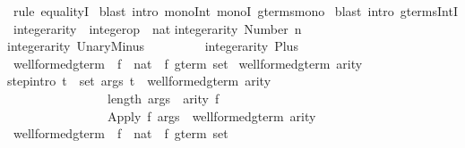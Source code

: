 \begin{isabellebody}
\ {\isacharparenleft}rule\ equalityI{\isacharparenright}\isanewline
{}\ {\isacharparenleft}blast\ intro{\isacharbang}{\isacharcolon}\ mono{\isacharunderscore}Int\ monoI\ gterms{\isacharunderscore}mono{\isacharparenright}\isanewline
{}\ {\isacharparenleft}blast\ intro{\isacharbang}{\isacharcolon}\ gterms{\isacharunderscore}IntI{\isacharparenright}\isanewline
{}\isanewline
\isanewline
\isanewline
{}\ integer{\isacharunderscore}arity\ {\isacharcolon}{\isacharcolon}\ {\isachardoublequote}integer{\isacharunderscore}op\ {\isasymRightarrow}\ nat{\isachardoublequote}\isanewline
{}\isanewline
{\isachardoublequote}integer{\isacharunderscore}arity\ {\isacharparenleft}Number\ n{\isacharparenright}\ \ \ \ \ \ \ \ {\isacharequal}\ {\isacharhash}{}{\isachardoublequote}\isanewline
{\isachardoublequote}integer{\isacharunderscore}arity\ UnaryMinus\ \ \ \ \ \ \ \ {\isacharequal}\ {\isacharhash}{}{\isachardoublequote}\isanewline
{\isachardoublequote}integer{\isacharunderscore}arity\ Plus\ \ \ \ \ \ \ \ \ \ \ \ \ \ {\isacharequal}\ {\isacharhash}{}{\isachardoublequote}\isanewline
\isanewline
{}\ well{\isacharunderscore}formed{\isacharunderscore}gterm\ {\isacharcolon}{\isacharcolon}\ {\isachardoublequote}{\isacharparenleft}{\isacharprime}f\ {\isasymRightarrow}\ nat{\isacharparenright}\ {\isasymRightarrow}\ {\isacharprime}f\ gterm\ set{\isachardoublequote}\isanewline
{}\ {\isachardoublequote}well{\isacharunderscore}formed{\isacharunderscore}gterm\ arity{\isachardoublequote}\isanewline
{}\isanewline
step{\isacharbrackleft}intro{\isacharbang}{\isacharbrackright}{\isacharcolon}\ {\isachardoublequote}{\isasymlbrakk}{\isasymforall}t\ {\isasymin}\ set\ args{\isachardot}\ t\ {\isasymin}\ well{\isacharunderscore}formed{\isacharunderscore}gterm\ arity{\isacharsemicolon}\ \ \isanewline
\ \ \ \ \ \ \ \ \ \ \ \ \ \ \ \ length\ args\ {\isacharequal}\ arity\ f{\isasymrbrakk}\isanewline
\ \ \ \ \ \ \ \ \ \ \ \ \ \ \ {\isasymLongrightarrow}\ {\isacharparenleft}Apply\ f\ args{\isacharparenright}\ {\isasymin}\ well{\isacharunderscore}formed{\isacharunderscore}gterm\ arity{\isachardoublequote}\isanewline
\isanewline
\isanewline
{}\ well{\isacharunderscore}formed{\isacharunderscore}gterm{\isacharprime}\ {\isacharcolon}{\isacharcolon}\ {\isachardoublequote}{\isacharparenleft}{\isacharprime}f\ {\isasymRightarrow}\ nat{\isacharparenright}\ {\isasymRightarrow}\ {\isacharprime}f\ gterm\ set{\isachardoublequote}\isanewline

\end{isabellebody}
